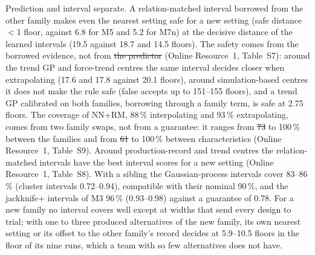 \documentclass[pdflatex,sn-basic,lineno]{sn-jnl}
\newcommand{\ORt}[1]{Online Resource~1, Table~S#1}
\providecommand{\DIFadd}[1]{{\protect\color{blue}\uwave{#1}}} %
\providecommand{\DIFdel}[1]{{\protect\color{red}\sout{#1}}}                      %
\providecommand{\DIFaddbegin}{} %
\providecommand{\DIFaddend}{} %
\providecommand{\DIFdelbegin}{} %
\providecommand{\DIFdelend}{} %
\newcommand{\DIFscaledelfig}{0.5}
\newlength{\DIFdelgraphicswidth} %
\newlength{\DIFdelgraphicsheight} %
\newcommand{\DIFaddincludegraphics}[2][]{{\color{blue}\fbox{\DIFOincludegraphics[#1]{#2}}}} %
\newcommand{\DIFdelincludegraphics}[2][]{%
\sbox{\DIFdelgraphicsbox}{\DIFOincludegraphics[#1]{#2}}%
\settoboxwidth{\DIFdelgraphicswidth}{\DIFdelgraphicsbox} %
\settoboxtotalheight{\DIFdelgraphicsheight}{\DIFdelgraphicsbox} %
\scalebox{\DIFscaledelfig}{%
\parbox[b]{\DIFdelgraphicswidth}{\usebox{\DIFdelgraphicsbox}\\[-\baselineskip] \rule{\DIFdelgraphicswidth}{0em}}\llap{\resizebox{\DIFdelgraphicswidth}{\DIFdelgraphicsheight}{%
\setlength{\unitlength}{\DIFdelgraphicswidth}%
\begin{picture}(1,1)%
\thicklines\linethickness{2pt} %
{\color[rgb]{1,0,0}\put(0,0){\framebox(1,1){}}}%
{\color[rgb]{1,0,0}\put(0,0){\line( 1,1){1}}}%
{\color[rgb]{1,0,0}\put(0,1){\line(1,-1){1}}}%
\end{picture}%
}\hspace*{3pt}}} %
} %
\DeclareRobustCommand{\DIFaddbegin}{\DIFOaddbegin \let\includegraphics\DIFaddincludegraphics} %
\DeclareRobustCommand{\DIFaddend}{\DIFOaddend \let\includegraphics\DIFOincludegraphics} %
\DeclareRobustCommand{\DIFdelbegin}{\DIFOdelbegin \let\includegraphics\DIFdelincludegraphics} %
\DeclareRobustCommand{\DIFdelend}{\DIFOaddend \let\includegraphics\DIFOincludegraphics} %
\begin{document}
Prediction and interval separate. A relation-matched interval borrowed from the other family makes even the nearest setting safe for a new setting (safe distance $<$1 floor, against 6.8 for M5 and 5.2 for M7n) at the decisive distance of the learned intervals (19.5 against 18.7 and 14.5 floors). The safety comes from the borrowed evidence, not from \DIFdelbegin \DIFdel{the predictor }\DIFdelend \DIFaddbegin \DIFadd{learning }\DIFaddend (\ORt{7}): around the trend GP and force-trend centres the same interval decides closer when extrapolating (17.6 and 17.8 against 20.1 floors), around simulation-based centres it does not make the rule safe (false accepts up to 151--155 floors), and a trend GP calibrated on both families, borrowing through a family term, is safe at 2.75 floors. The coverage of NN+RM, 88\,\% interpolating and 93\,\% extrapolating, comes from two family swaps, not from a guarantee: it ranges from \DIFdelbegin \DIFdel{73 }\DIFdelend \DIFaddbegin \DIFadd{76 }\DIFaddend to 100\,\% between the families and from \DIFdelbegin \DIFdel{61 }\DIFdelend \DIFaddbegin \DIFadd{67 }\DIFaddend to 100\,\% between characteristics (\ORt{9}). Around production-record and trend centres the relation-matched intervals have the best interval scores \citep{gneiting2007strictly} for a new setting (\ORt{8}). With a sibling the Gaussian-process intervals cover 83--86\,\% (cluster intervals 0.72--0.94), compatible with their nominal 90\,\%, and the jackknife+ intervals of M3 96\,\% (0.93--0.98) against a guarantee of 0.78. For a new family no interval covers well except at widths that send every design to trial; with one to three produced alternatives of the new family, its own nearest setting or its offset to the other family's record decides at 5.9--10.5 floors in the floor of its nine runs, which a team with so few alternatives does not have.
\end{document}
